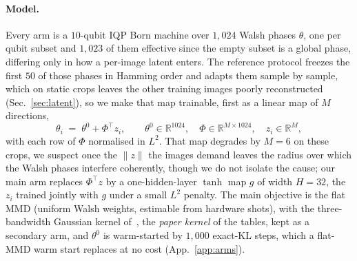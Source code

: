 \documentclass{article}
\begin{document}
\paragraph{Model.}
Every arm is a $10$-qubit IQP Born machine over $1{,}024$ Walsh phases $\theta$, one per qubit
subset and $1{,}023$ of them effective since the empty subset is a global phase, differing only in
how a per-image latent enters. The reference protocol freezes the first $50$ of
those phases in Hamming order and adapts them sample by sample, which on static crops leaves the
other training images poorly reconstructed (Sec.~\ref{sec:latent}), so we make that map trainable,
first as a linear map of $M$ directions,
\begin{equation}
\theta_i \;=\; \theta^{0} + \Phi^{\!\top} z_i,
\qquad \theta^{0}\in\mathbb{R}^{1024},\quad
\Phi\in\mathbb{R}^{M\times 1024},\quad z_i \in \mathbb{R}^{M},
\label{eq:affine}
\end{equation}
with each row of $\Phi$ normalised in $L^2$. That map degrades by $M{=}6$ on these crops, we suspect
once the $\|z\|$ the images demand leaves the radius over which the Walsh phases interfere
coherently, though we do not isolate the cause; our main arm replaces $\Phi^{\!\top} z$ by a
one-hidden-layer $\tanh$ map $g$ of width $H{=}32$, the $z_i$ trained jointly with $g$ under a small
$L^2$ penalty. The main objective is the flat MMD (uniform Walsh weights, estimable from hardware
shots), with the three-bandwidth Gaussian kernel of~\cite{recio_2025_train}, the \emph{paper
kernel} of the tables, kept as a secondary arm, and $\theta^{0}$ is warm-started by
$1{,}000$ exact-KL steps, which a flat-MMD warm start replaces at no cost (App.~\ref{app:arms}).
\end{document}
